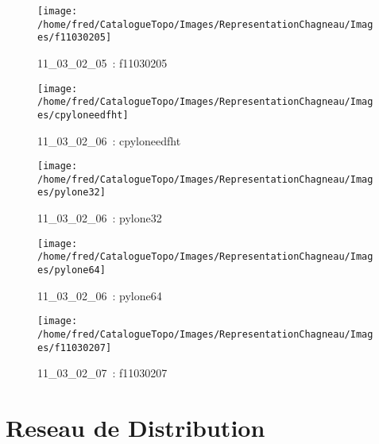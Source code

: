 \documentclass[12pt,titlepage]{book}
\begin{document}
\begin{figure}[h!]
  \hfill         %
  \begin{minipage}[t]{3cm}
    \begin{center}
      \texttt{[image: /home/fred/CatalogueTopo/Images/RepresentationChagneau/Images/f11030205]}
      \caption[~11\_03\_02\_05]{\small{11\_03\_02\_05~:} \tiny{f11030205}}\label{f11030205}
    \end{center}
  \end{minipage}
  \begin{minipage}[t]{3cm}
    \begin{center}
      \texttt{[image: /home/fred/CatalogueTopo/Images/RepresentationChagneau/Images/cpyloneedfht]}
      \caption[~11\_03\_02\_06]{\small{11\_03\_02\_06~:} \tiny{cpyloneedfht}}\label{cpyloneedfht}
    \end{center}
  \end{minipage}
  \begin{minipage}[t]{3cm}
    \begin{center}
      \texttt{[image: /home/fred/CatalogueTopo/Images/RepresentationChagneau/Images/pylone32]}
      \caption[~11\_03\_02\_06]{\small{11\_03\_02\_06~:} \tiny{pylone32}}\label{pylone32}
    \end{center}
  \end{minipage}
  \begin{minipage}[t]{3cm}
    \begin{center}
      \texttt{[image: /home/fred/CatalogueTopo/Images/RepresentationChagneau/Images/pylone64]}
      \caption[~11\_03\_02\_06]{\small{11\_03\_02\_06~:} \tiny{pylone64}}\label{pylone64}
    \end{center}
  \end{minipage}
  \begin{minipage}[t]{3cm}
    \begin{center}
      \texttt{[image: /home/fred/CatalogueTopo/Images/RepresentationChagneau/Images/f11030207]}
      \caption[~11\_03\_02\_07]{\small{11\_03\_02\_07~:} \tiny{f11030207}}\label{f11030207}
    \end{center}
  \end{minipage}
\end{figure}
\chapter{Reseau de Distribution}
\end{document}
